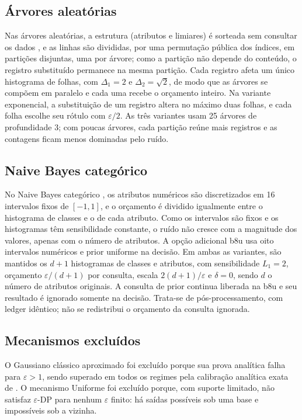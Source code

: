 \subsection{Árvores aleatórias}

Nas árvores aleatórias, a estrutura (atributos e limiares) é sorteada sem consultar os dados \cite{ref62}, e as linhas são divididas, por uma permutação pública dos índices, em partições disjuntas, uma por árvore; como a partição não depende do conteúdo, o registro substituído permanece na mesma partição. Cada registro afeta um único histograma de folhas, com $\Delta_1 = 2$ e $\Delta_2 = \sqrt{2}$, de modo que as árvores se compõem em paralelo e cada uma recebe o orçamento inteiro. Na variante exponencial, a substituição de um registro altera no máximo duas folhas, e cada folha escolhe seu rótulo com $\varepsilon/2$. As três variantes usam 25 árvores de profundidade 3; com poucas árvores, cada partição reúne mais registros e as contagens ficam menos dominadas pelo ruído.

\subsection{Naive Bayes categórico}

No Naive Bayes categórico \cite{ref63}, os atributos numéricos são discretizados em 16 intervalos fixos de $[-1, 1]$, e o orçamento é dividido igualmente entre o histograma de classes e o de cada atributo. Como os intervalos são fixos e os histogramas têm sensibilidade constante, o ruído não cresce com a magnitude dos valores, apenas com o número de atributos. A opção adicional b8u usa oito intervalos numéricos e prior uniforme na decisão. Em ambas as variantes, são mantidos os $d+1$ histogramas de classes e atributos, com sensibilidade $L_1=2$, orçamento $\varepsilon/(d+1)$ por consulta, escala $2(d+1)/\varepsilon$ e $\delta=0$, sendo $d$ o número de atributos originais. A consulta de prior continua liberada na b8u e seu resultado é ignorado somente na decisão. Trata-se de pós-processamento, com ledger idêntico; não se redistribui o orçamento da consulta ignorada.

\subsection{Mecanismos excluídos}

O Gaussiano clássico aproximado foi excluído porque sua prova analítica falha para $\varepsilon > 1$, sendo superado em todos os regimes pela calibração analítica exata de . O mecanismo Uniforme foi excluído porque, com suporte limitado, não satisfaz $\varepsilon$-DP para nenhum $\varepsilon$ finito: há saídas possíveis sob uma base e impossíveis sob a vizinha.

